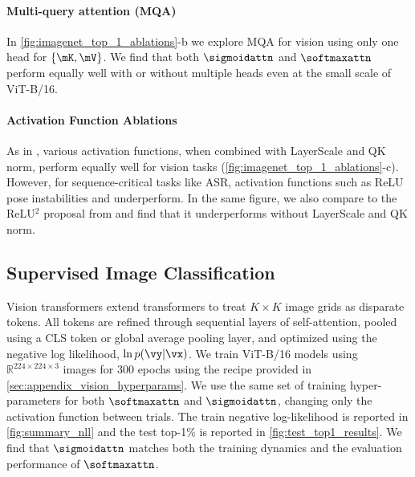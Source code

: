\paragraph{Multi-query attention (MQA)} In \cref{fig:imagenet_top_1_ablations}-b we explore MQA \citep{DBLP:journals/corr/abs-1911-02150} for vision using only one head for $\{ \mK, \mV \}$. We find that both $\sigmoidattn$ and $\softmaxattn$ perform equally well with or without multiple heads even at the small scale of ViT-B/16.
\paragraph{Activation Function Ablations} As in \citet{wortsman2023replacing}, various activation functions, when combined with LayerScale and QK norm, perform equally well for vision tasks (\cref{fig:imagenet_top_1_ablations}-c). However, for sequence-critical tasks like ASR, activation functions such as ReLU pose instabilities and underperform. In the same figure, we also compare to the ReLU$^2$ proposal from \citet{DBLP:conf/icml/HuaDLL22} and find that it underperforms without LayerScale and QK norm.
\subsection{Supervised Image Classification}
\label{sec:supervised_image_classification}
Vision transformers \citep{DBLP:conf/iclr/DosovitskiyB0WZ21} extend transformers  \citep{DBLP:conf/nips/VaswaniSPUJGKP17} to treat $K \times K$ image grids as disparate tokens. All tokens are refined through sequential layers of self-attention, pooled using a CLS token or global average pooling layer, and optimized using the negative log likelihood, $\ln p(\vy|\vx)$. We train ViT-B/16 models using $\mathbb{R}^{224 \times 224 \times 3}$ images for 300 epochs using the recipe provided in \cref{sec:appendix_vision_hyperparams}. We use the same set of training hyper-parameters for both $\softmaxattn$ and $\sigmoidattn$, changing only the activation function between trials. The train negative log-likelihood is reported in \cref{fig:summary_nll} and the test top-1\% is reported in \cref{fig:test_top1_results}. We find that $\sigmoidattn$ matches both the training dynamics and the evaluation performance of $\softmaxattn$.
